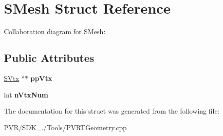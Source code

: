 \hypertarget{struct_s_mesh}{\section{S\+Mesh Struct Reference}
\label{struct_s_mesh}
}


Collaboration diagram for S\+Mesh\+:
\subsection*{Public Attributes}
\begin{DoxyCompactItemize}
\item 
\hypertarget{struct_s_mesh_ad456b827cc7e0f0ab3d235527b985abb}{\hyperlink{struct_s_vtx}{S\+Vtx} $\ast$$\ast$ {\bfseries pp\+Vtx}}\label{struct_s_mesh_ad456b827cc7e0f0ab3d235527b985abb}

\item 
\hypertarget{struct_s_mesh_a77cd1ef767e599ff72a279fde3a732ef}{int {\bfseries n\+Vtx\+Num}}\label{struct_s_mesh_a77cd1ef767e599ff72a279fde3a732ef}

\end{DoxyCompactItemize}


The documentation for this struct was generated from the following file\+:\begin{DoxyCompactItemize}
\item 
P\+V\+R/\+S\+D\+K\+\_./\+Tools/P\+V\+R\+T\+Geometry.\+cpp\end{DoxyCompactItemize}
